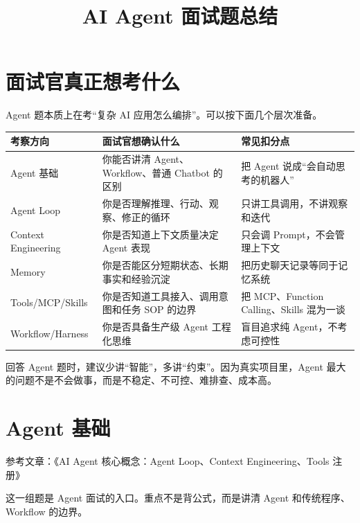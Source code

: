 \documentclass[9pt,a4paper,twocolumn]{ctexart}
\begin{document}
\title{AI Agent 面试题总结}
\date{}
\maketitle
{}

\section*{面试官真正想考什么}


Agent 题本质上在考“复杂 AI 应用怎么编排”。可以按下面几个层次准备。


{\footnotesize
\begin{tabular}{|p{}|p{}|p{}|}
\hline
\textbf{考察方向} & \textbf{面试官想确认什么} & \textbf{常见扣分点} \\
\hline
Agent 基础 & 你能否讲清 Agent、Workflow、普通 Chatbot 的区别 & 把 Agent 说成“会自动思考的机器人” \\
\hline
Agent Loop & 你是否理解推理、行动、观察、修正的循环 & 只讲工具调用，不讲观察和迭代 \\
\hline
Context Engineering & 你是否知道上下文质量决定 Agent 表现 & 只会调 Prompt，不会管理上下文 \\
\hline
Memory & 你是否能区分短期状态、长期事实和经验沉淀 & 把历史聊天记录等同于记忆系统 \\
\hline
Tools/MCP/Skills & 你是否知道工具接入、调用意图和任务 SOP 的边界 & 把 MCP、Function Calling、Skills 混为一谈 \\
\hline
Workflow/Harness & 你是否具备生产级 Agent 工程化思维 & 盲目追求纯 Agent，不考虑可控性 \\
\hline
\end{tabular}
}



回答 Agent 题时，建议少讲“智能”，多讲“约束”。因为真实项目里，Agent 最大的问题不是不会做事，而是不稳定、不可控、难排查、成本高。



\section*{Agent 基础}


参考文章：《AI Agent 核心概念：Agent Loop、Context Engineering、Tools 注册》



这一组题是 Agent 面试的入口。重点不是背公式，而是讲清 Agent 和传统程序、Workflow 的边界。
\end{document}
